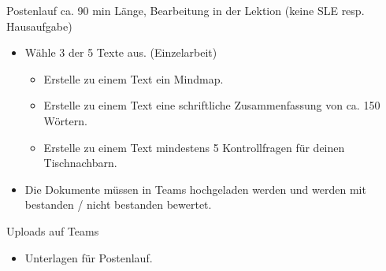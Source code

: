 \begin{frame}{Postenlauf}
ca. 90 min Länge, Bearbeitung in der Lektion (keine SLE resp. Hausaufgabe)
\begin{itemize}
    \item [\textbullet] Wähle 3 der 5 Texte aus. (Einzelarbeit)
    \begin{itemize}
        \item [\textbullet] Erstelle zu einem Text ein Mindmap. 
        \item [\textbullet] Erstelle zu einem Text eine schriftliche Zusammenfassung von ca. 150 Wörtern.
        \item [\textbullet] Erstelle zu einem Text mindestens 5 Kontrollfragen für deinen Tischnachbarn.
    \end{itemize}
    \item [\textbullet] Die Dokumente müssen in Teams hochgeladen werden und werden mit bestanden / nicht bestanden bewertet.
\end{itemize}
\end{frame}


    \begin{frame}{Uploads auf Teams}
        \begin{itemize}
            \item[\textbullet] Unterlagen für Postenlauf.
        \end{itemize}
        
    \end{frame}

        
    \folieFragen


    